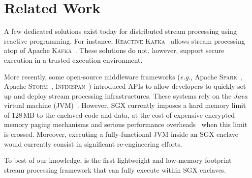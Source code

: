 \section{Related Work}\label{sec:rw}


A few dedicated solutions exist today for distributed stream processing using reactive programming.
For instance, \textsc{Reactive Kafka}~\cite{reactivekafka} allows stream processing atop of Apache \textsc{Kafka}~\cite{apachekafka}.
These solutions do not, however, support secure execution in a trusted execution environment.

More recently, some open-source middleware frameworks (\emph{e.g.}, Apache \textsc{Spark}~\cite{apachesparkstreaming}, Apache \textsc{Storm}~\cite{apachestorm}, \textsc{Infinispan}~\cite{infinispan}) introduced APIs to allow developers to quickly set up and deploy stream processing infrastructures.
These systems rely on the \emph{Java} virtual machine (JVM)~\cite{lindholm2014java}.
However, SGX currently imposes a hard memory limit of 128\,MB to the enclaved code and data, at the cost of expensive encrypted memory paging mechanisms and serious performance overheads~\cite{pires_scbr:2016,brenner_securekeeper:_2016} when this limit is crossed.
Moreover, executing a fully-functional JVM inside an SGX enclave would currently consist in significant re-engineering efforts.


To best of our knowledge, \SYS{} is the first lightweight and low-memory footprint stream processing framework that can fully execute within SGX enclaves.
